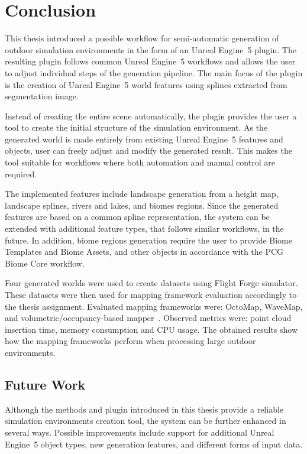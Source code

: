 
\chapter{Conclusion\label{chap:conclusion}}

This thesis introduced a possible workflow for semi-automatic generation of outdoor simulation environments in the form of an Unreal Engine~5 plugin. The resulting plugin follows common Unreal Engine~5 workflows and allows the user to adjust individual steps of the generation pipeline. The main focus of the plugin is the creation of Unreal Engine~5 world features using splines extracted from segmentation image. 

Instead of creating the entire scene automatically, the plugin provides the user a tool to create the initial structure of the simulation environment. As the generated world is made entirely from existing Unreal Engine~5 features and objects, user can freely adjust and modify the generated result. This makes the tool suitable for workflows where both automation and manual control are required.

The implemented features include landscape generation from a height map, landscape splines, rivers and lakes, and biomes regions. Since the generated features are based on a common spline representation, the system can be extended with additional feature types, that follows similar workflows, in the future. In addition, biome regions generation require the user to provide Biome Templates and Biome Assets, and other objects in accordance with the \ac{PCG} Biome Core workflow.

Four generated worlds were used to create datasets using Flight Forge simulator. These datasets were then used for mapping framework evaluation accordingly to the thesis assignment. Evaluated mapping frameworks were: OctoMap, WaveMap, 
and volumetric/occupancy-based mapper~\cite{bk_capek_masters}. Observed metrics were: point cloud insertion time, memory consumption and CPU usage. The obtained results show how the mapping frameworks perform when processing large outdoor environments.

\section{Future Work}

Although the methods and plugin introduced in this thesis provide a reliable simulation environments creation tool, the system can be further enhanced in several ways. Possible improvements include support for additional Unreal Engine~5 object types, new generation features, and different forms of input data.

